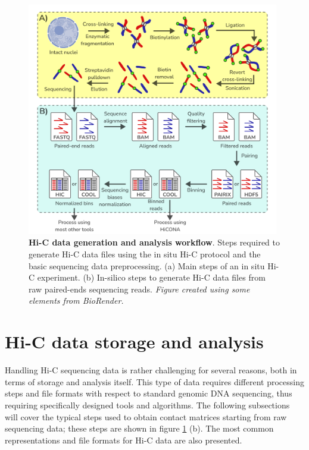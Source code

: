 \begin{figure}[ht]
  \centering
  \includegraphics[width=0.98\textwidth]{hic_pipeline.png}
  \caption{\textbf{Hi-C data generation and analysis workflow}. Steps required to generate Hi-C data files using the in situ Hi-C protocol and the basic sequencing data preprocessing. (a) Main steps of an in situ Hi-C experiment. (b) In-silico steps to generate Hi-C data files from raw paired-ends sequencing reads. \textit{Figure created using some elements from BioRender.}}
  \label{fig:pipeline}
\end{figure}

\newpage
\section{Hi-C data storage and analysis}

Handling Hi-C sequencing data is rather challenging for several reasons, both in terms of storage and analysis itself. This type of data requires different processing steps and file formats with respect to standard genomic DNA sequencing, thus requiring specifically designed tools and algorithms. The following subsections will cover the typical steps used to obtain contact matrices starting from raw sequencing data\cite{hicprocessing2018}; these steps are shown in figure \ref{fig:pipeline} (b). The most common representations and file formats for Hi-C data are also presented.

